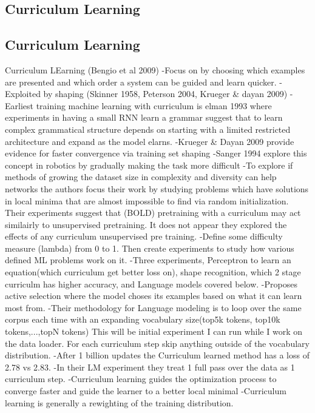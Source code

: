 \subsection{Curriculum Learning}
\iffalse
\subsection{Curriculum Learning}
Curriculum LEarning (Bengio et al 2009)
-Focus on by choosing which examples are presented and which order a system can be guided and learn quicker. 
-Exploited by shaping (Skinner 1958, Peterson 2004, Krueger & dayan 2009)
-Earliest training machine learning with curriculum is elman 1993 where experiments in having a small RNN learn a grammar suggest that to learn complex grammatical structure depends on starting with a limited restricted architecture and expand as the model elarns. 
-Krueger & Dayan 2009 provide evidence for faster convergence via training set shaping
-Sanger 1994 explore this concept in robotics by gradually making the task more difficult
-To explore if methods of growing the dataset size in complexity and diversity can help networks the authors focus their work by studying problems which have solutions in local minima that are almost impossible to find via random initialization. Their experiments suggest that (BOLD) pretraining with a curriculum may act similairly to unsupervised pretraining. It does not appear they explored the effects of any curriculum unsupervised pre training.
-Define some difficulty measure (lambda) from 0 to 1. Then create experiments to study how various defined ML problems work on it.
-Three experiments, Perceptron to learn an equation(which curriculum get better loss on), shape recognition, which 2 stage curriculm has higher accuracy, and Language models covered below.
-Proposes active selection where the model choses its examples based on what it can learn most from.
-Their methodology for Language modeling is to loop over the same corpus each time with an expanding vocabulary size(top5k tokens, top10k tokens,...,topN tokens) This will be initial experiment I can run while I work on the data loader. For each curriculum step skip anything outside of the vocabulary distribution. 
-After 1 billion updates the Curriculum learned method has a loss of 2.78 vs 2.83.
-In their LM experiment they treat 1 full pass over the data as 1 curriculum step. 
-Curriculum learning guides the optimization process to converge faster and guide the learner to a better local minimal
-Curriculum learning is generally a rewighting of the training distribution. 
